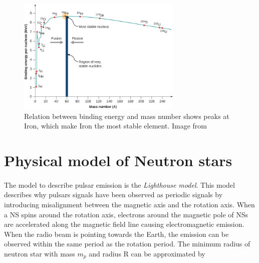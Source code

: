 \documentclass[thesis_msc.tex]{subfiles}
\begin{document}
    \begin{figure}[htbp] \centering
\includegraphics[width=0.70\textwidth]{figures/binding.jpg}
\caption{Relation between binding energy and mass number shows peaks at Iron, which make Iron the most stable element. Image from \cite{urone_hinrichs_dirks_sharma_2018} }

\label{binding}
\end{figure}

\section{Physical model of Neutron stars} \label{phys}
    \paragraph{} The model to describe pulsar emission is  the \textit{Lighthouse model}. This model describes why pulsars signals have been observed as periodic signals by introducing misalignment between the magnetic axis and the rotation axis. When a NS spins around the rotation axis, electrons around the magnetic pole of NSs are accelerated along the magnetic field line causing electromagnetic emission. %
    When the radio beam is pointing towards the Earth, the emission can be observed within the same period as the rotation period. The minimum radius of neutron star with mass $m_p$ and radius R  can be approximated by 
\end{document}
